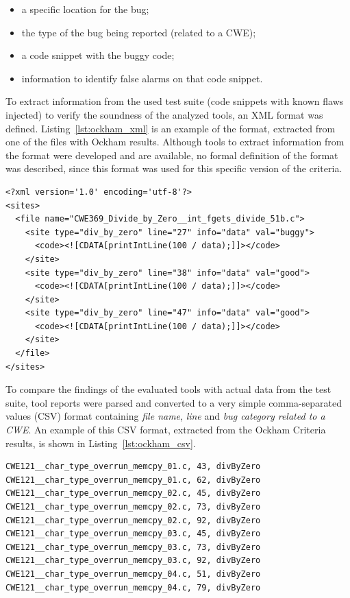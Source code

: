 \begin{itemize}
\item a specific location for the bug;
\item the type of the bug being reported (related to a CWE);
\item a code snippet with the buggy code;
\item information to identify false alarms on that code snippet.
\end{itemize}

To extract information from the used test suite (code snippets with known
flaws injected) to verify the soundness of the analyzed tools, an XML
format was defined. Listing~\ref{lst:ockham_xml} is an example of the format,
extracted from one of the files with Ockham results.  Although tools to extract
information from the format were developed and are available, no formal
definition of the format was described, since this format was used for this
specific version of the criteria.

\begin{minipage}{\linewidth}
\begin{lstlisting}[frame=none, caption={Ockham Criteria XML bug report example},label={lst:ockham_xml}]
<?xml version='1.0' encoding='utf-8'?>
<sites>
  <file name="CWE369_Divide_by_Zero__int_fgets_divide_51b.c">
    <site type="div_by_zero" line="27" info="data" val="buggy">
      <code><![CDATA[printIntLine(100 / data);]]></code>
    </site>
    <site type="div_by_zero" line="38" info="data" val="good">
      <code><![CDATA[printIntLine(100 / data);]]></code>
    </site>
    <site type="div_by_zero" line="47" info="data" val="good">
      <code><![CDATA[printIntLine(100 / data);]]></code>
    </site>
  </file>
</sites>
\end{lstlisting}
\end{minipage}

To compare the findings of the evaluated tools with actual data from the test suite,
tool reports were parsed and converted to a very simple comma-separated values
(CSV) format containing \textit{file name}, \textit{line} and \textit{bug category
related to a CWE}. An example of this CSV format, extracted from the Ockham
Criteria results, is shown in Listing~\ref{lst:ockham_csv}.

\begin{minipage}{\linewidth}
\lstset{language=Python}
\begin{lstlisting}[frame=none, caption={Ockham Criteria CSV bug report example},label={lst:ockham_csv}]
CWE121__char_type_overrun_memcpy_01.c, 43, divByZero
CWE121__char_type_overrun_memcpy_01.c, 62, divByZero
CWE121__char_type_overrun_memcpy_02.c, 45, divByZero
CWE121__char_type_overrun_memcpy_02.c, 73, divByZero
CWE121__char_type_overrun_memcpy_02.c, 92, divByZero
CWE121__char_type_overrun_memcpy_03.c, 45, divByZero
CWE121__char_type_overrun_memcpy_03.c, 73, divByZero
CWE121__char_type_overrun_memcpy_03.c, 92, divByZero
CWE121__char_type_overrun_memcpy_04.c, 51, divByZero
CWE121__char_type_overrun_memcpy_04.c, 79, divByZero
\end{lstlisting}
\end{minipage}

